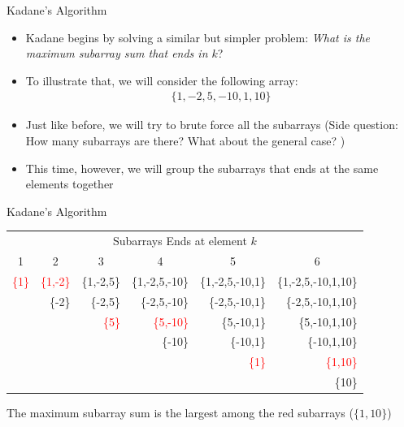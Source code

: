 \documentclass[10pt,xcolor={table,dvipsnames},t]{beamer}
\begin{document}
\begin{frame}{Kadane's Algorithm}
  \begin{itemize}
    \item Kadane begins by solving a similar but simpler problem: \textit{What is the maximum subarray sum that ends in $k$}?
    \item To illustrate that, we will consider the following array:
    \begin{align*}
      \{1,-2,5,-10,1,10\}
    \end{align*}
    \item Just like before, we will try to brute force all the subarrays (Side question: How many subarrays are there? What about the general case? )
    \item This time, however, we will group the subarrays that ends at the same elements together
  \end{itemize}
\end{frame}

\begin{frame}{Kadane's Algorithm}
  \begin{table}[]
    \begin{tabular}{rrrrrr}
    \multicolumn{6}{c}{Subarrays Ends at element $k$}                                                                                               \\
    \multicolumn{1}{c}{1} & \multicolumn{1}{c}{2} & \multicolumn{1}{c}{3} & \multicolumn{1}{c}{4} & \multicolumn{1}{c}{5} & \multicolumn{1}{c}{6} \\
    \textcolor{red}{\{1\}}                 & \textcolor{red}{\{1,-2\}}              & \{1,-2,5\}            & \{1,-2,5,-10\}        & \{1,-2,5,-10,1\}      & \{1,-2,5,-10,1,10\}   \\
                          & \{-2\}                & \{-2,5\}              & \{-2,5,-10\}          & \{-2,5,-10,1\}        & \{-2,5,-10,1,10\}     \\
                          &                       & \textcolor{red}{\{5\}}                 & \textcolor{red}{\{5,-10\}}             & \{5,-10,1\}           & \{5,-10,1,10\}        \\
                          &                       &                       & \{-10\}               & \{-10,1\}             & \{-10,1,10\}          \\
                          &                       &                       &                       & \textcolor{red}{\{1\}}                 & \textcolor{red}{\{1,10\}}              \\
                          &                       &                       &                       &                       & \{10\}               
    \end{tabular}
    \end{table}
    The maximum subarray sum is the largest among the red subarrays ($\{1,10\}$)
\end{frame}
\end{document}
